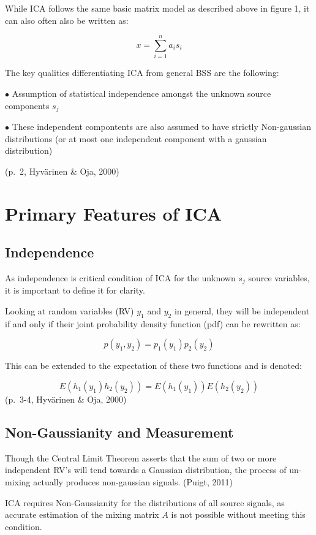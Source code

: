 \documentclass[12pt,twoside]{amherstthesis}
\begin{document}
  While ICA follows the same basic matrix model as described above in
  figure 1, it can also often also be written as:
  
  \[x = \sum_{i=1}^n a_is_i\]
  
  The key qualities differentiating ICA from general BSS are the
  following:
  
  \(\bullet\) Assumption of statistical independence amongst the unknown
  source components \(s_j\)
  
  \(\bullet\) These independent compontents are also assumed to have
  strictly Non-gaussian distributions (or at most one independent
  component with a gaussian distribution)
  
  (p.~2, Hyvärinen \& Oja, 2000)
  
  \section{Primary Features of ICA}\label{primary-features-of-ica}
  
  \subsection{Independence}\label{independence}
  
  As independence is critical condition of ICA for the unknown \(s_j\)
  source variables, it is important to define it for clarity.
  
  Looking at random variables (RV) \(y_1\) and \(y_2\) in general, they
  will be independent if and only if their joint probability density
  function (pdf) can be rewritten as:
  
  \[p(y_1,y_2) = p_1(y_1)p_2(y_2)\]
  
  This can be extended to the expectation of these two functions and is
  denoted:
  
  \[E(h_1(y_1)h_2(y_2)) = E(h_1(y_1))E(h_2(y_2))\] (p.~3-4, Hyvärinen \&
  Oja, 2000)
  
  \subsection{Non-Gaussianity and
  Measurement}\label{non-gaussianity-and-measurement}
  
  Though the Central Limit Theorem asserts that the sum of two or more
  independent RV's will tend towards a Gaussian distribution, the process
  of un-mixing actually produces non-gaussian signals. (Puigt, 2011)
  
  ICA requires Non-Gaussianity for the distributions of all source
  signals, as accurate estimation of the mixing matrix \(A\) is not
  possible without meeting this condition.
  
\end{document}
